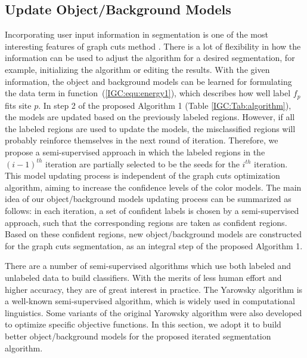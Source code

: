 \subsection{Update Object/Background Models} \label{sec:3:Models}
Incorporating user input information in segmentation is one of the most interesting features of graph cuts method \cite{Yuri06}. There is a lot of flexibility in how the information can be used to adjust
the algorithm for a desired segmentation, for example, initializing the algorithm or editing the results. With the given information, the object and background models can be learned for formulating the data term in function~(\ref{IGC:equ:energy1}), which describes how well label $f_p$ fits site $p$. In step 2 of the proposed Algorithm 1 (Table \ref{IGC:Tab:algorithm}), the models are updated based on the previously labeled regions. However, if all the labeled regions are used to update the models,
the misclassified regions will probably reinforce themselves in the
next round of iteration. Therefore, we propose a semi-supervised
approach in which the labeled regions in the $(i-1)^{th}$ iteration are
partially selected to be the seeds for the $i^{th}$ iteration. This
model updating process is independent of the graph cuts optimization
algorithm, aiming to increase the confidence levels of the color
models. The main idea of our object/background models updating
process can be summarized as follows: in each iteration, a set of
confident labels is chosen by a semi-supervised approach, such that
the corresponding regions are taken as confident regions. Based on
these confident regions, new object/background models are
constructed for the graph cuts segmentation, as an integral step of
the proposed Algorithm 1.

There are a number of semi-supervised algorithms which use both labeled and unlabeled data to build classifiers. With the merits of less human effort and higher accuracy, they are of great interest in
practice. The Yarowsky algorithm \cite{Yarowsky} is a well-known semi-supervised algorithm, which is widely used in computational linguistics. Some variants of the original Yarowsky algorithm
\cite{Abney,Haffari} were also developed to optimize specific objective functions. In this section, we adopt it to build better object/background models for the proposed iterated segmentation
algorithm.

